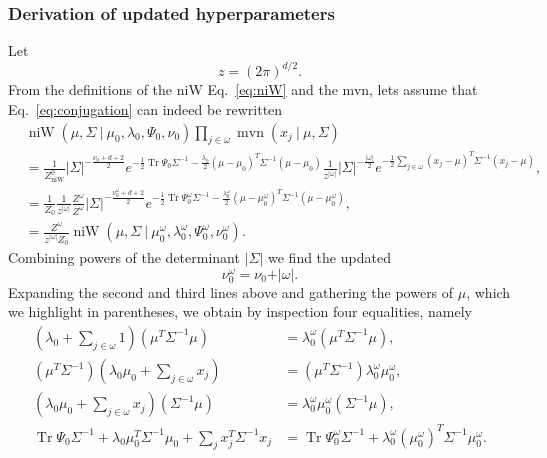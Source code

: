 \documentclass[11pt, oneside]{article}   	%
\DeclareMathOperator{\Tr}{Tr}
\DeclareMathOperator{\niW}{niW}
\begin{document}
\subsubsection{Derivation of updated hyperparameters}
Let
$$z = (2\pi)^{d/2}.$$
From the definitions of the niW Eq.~\ref{eq:niW} and the mvn, lets assume that Eq.~\ref{eq:conjugation} can indeed be rewritten
\begin{equation}\begin{split}
&\niW(\mu, \Sigma~\vert~ \mu_0, \lambda_0,\Psi_0,\nu_0)\prod_{j\in\omega}\operatorname{mvn}(x_j~\vert~\mu,\Sigma)\\
& = \frac{1}{Z^0_{\niW}}\vert\Sigma\vert^{-\frac{\nu_0 + d + 2}{2}} e^{-\frac{1}{2}\Tr\Psi_0\Sigma^{-1}-\frac{\lambda_0}{2}(\mu - \mu_0)^T \Sigma^{-1}(\mu - \mu_0)}\frac{1}{z^{\vert\omega\vert}}\vert\Sigma\vert^{-\frac{\vert\omega\vert}{2}} e^{-\frac{1}{2}\sum_{j\in\omega}(x_j - \mu)^T\Sigma^{-1}(x_j - \mu)},\\
&=  \frac{1}{Z_0}\frac{1}{z^{\vert\omega\vert}} \frac{Z^\omega}{Z^\omega}\vert\Sigma\vert^{-\frac{\nu_0^\omega + d + 2}{2}}e^{-\frac{1}{2}\Tr\Psi_0^\omega\Sigma^{-1} - \frac{\lambda_0^\omega}{2}(\mu - \mu_0^\omega)^T\Sigma^{-1}(\mu - \mu_0^\omega)},\\
&= \frac{Z^\omega}{z^{\vert\omega\vert} Z_0} \niW(\mu,\Sigma~\vert~\mu_0^\omega,\lambda_0^\omega,\Psi_0^\omega,\nu_0^\omega).
\label{eq:niW}\end{split}\end{equation}
Combining powers of the determinant $\vert\Sigma\vert$ we find the updated
$$\nu_0^\omega = \nu_0 + \vert\omega\vert.$$
Expanding the second and third lines above and gathering the powers of $\mu$, which we highlight in parentheses, we obtain by inspection four equalities, namely
\begin{equation}\begin{split}
(\lambda_0 + \sum_{j\in\omega} 1)\left(\mu^T\Sigma^{-1}\mu\right) &= \lambda_0^\omega\left(\mu^T\Sigma^{-1}\mu\right),\\
\left(\mu^T\Sigma^{-1}\right)(\lambda_0\mu_0 + \sum_{j\in\omega} x_j ) &= \left(\mu^T\Sigma^{-1}\right)\lambda_0^\omega \mu_0^\omega,\\
(\lambda_0\mu_0 + \sum_{j\in\omega} x_j)\left(\Sigma^{-1}\mu\right) &= \lambda_0^\omega \mu_0^\omega\left(\Sigma^{-1}\mu\right),\\
\Tr\Psi_0\Sigma^{-1} + \lambda_0\mu_0^T\Sigma^{-1}\mu_0 + \sum_j x_j^T\Sigma^{-1} x_j &= \Tr\Psi_0^\omega\Sigma^{-1} + \lambda_0^\omega(\mu_0^\omega)^T\Sigma^{-1}\mu_0^\omega.
\end{split}\end{equation}
\end{document}
